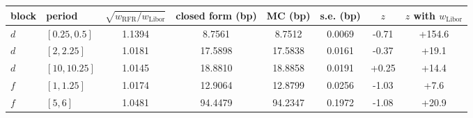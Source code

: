 \begin{tabular}{llcccccc}
\toprule
block & period & $\sqrt{w_{\mathrm{RFR}}/w_{\mathrm{Libor}}}$ & closed form (bp) & MC (bp) & s.e. (bp) & $z$ & $z$ with $w_{\mathrm{Libor}}$ \\
\midrule
$d$ & $[0.25, 0.5]$ & 1.1394 & 8.7561 & 8.7512 & 0.0069 & -0.71 & +154.6 \\
$d$ & $[2, 2.25]$ & 1.0181 & 17.5898 & 17.5838 & 0.0161 & -0.37 & +19.1 \\
$d$ & $[10, 10.25]$ & 1.0145 & 18.8810 & 18.8858 & 0.0191 & +0.25 & +14.4 \\
$f$ & $[1, 1.25]$ & 1.0174 & 12.9064 & 12.8799 & 0.0256 & -1.03 & +7.6 \\
$f$ & $[5, 6]$ & 1.0481 & 94.4479 & 94.2347 & 0.1972 & -1.08 & +20.9 \\
\bottomrule
\end{tabular}